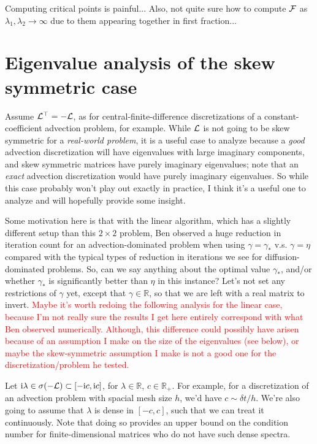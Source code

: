 \documentclass[a4paper,10pt]{article}
\newcommand{\tcr}{\textcolor{red}}
\begin{document}
{Computing critical points is painful... Also, not quite sure how to compute ${\cal F}$ as $\lambda_1, \lambda_2 \to \infty$ due to them appearing together in first fraction...




\newpage
\section{Eigenvalue analysis of the skew symmetric case}
Assume ${\cal L}^\top = - {\cal L}$, as for central-finite-difference discretizations of a constant-coefficient advection problem, for example. While ${\cal L}$ is not going to be skew symmetric for a \textit{real-world problem}, it is a useful case to analyze because a \textit{good} advection discretization will have eigenvalues with large imaginary components, and skew symmetric matrices have purely imaginary eigenvalues; note that an \textit{exact} advection discretization would have purely imaginary eigenvalues. So while this case probably won't play out exactly in practice, I think it's a useful one to analyze and will hopefully provide some insight.

Some motivation here is that with the linear algorithm, which has a slightly different setup than this $2 \times 2$ problem, Ben observed a huge reduction in iteration count for an advection-dominated problem when using $\gamma = \gamma_*$ v.s. $\gamma = \eta$ compared with the typical types of reduction in iterations we see for diffusion-dominated problems. So, can we say anything about the optimal value $\gamma_*$, and/or whether $\gamma_*$ is significantly better than $\eta$ in this instance? Let's not set any restrictions of $\gamma$ yet, except that $\gamma \in \mathbb{R}$, so that we are left with a real matrix to invert. \tcr{Maybe it's worth redoing the following analysis for the linear case, because I'm not really sure the results I get here entirely correspond with what Ben observed numerically. Although, this difference could possibly have arisen because of an assumption I make on the size of the eigenvalues (see below), or maybe the skew-symmetric assumption I make is not a good one for the discretization/problem he tested.}

Let $\mathrm{i} \lambda \in \sigma(- {\cal L}) \subset [-\mathrm{i} c, \mathrm{i} c]$, for $\lambda \in \mathbb{R}$, $c \in \mathbb{R}_+$. For example, for a discretization of an advection problem with spacial mesh size $h$, we'd have $c \sim \delta t / h$. We're also going to assume that $\lambda$ is dense in $[-c,c]$, such that we can  treat it continuously. Note that doing so provides an upper bound on the condition number for finite-dimensional matrices who do not have such dense spectra.

}
\end{document}
